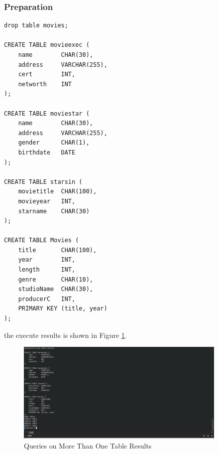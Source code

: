 \documentclass{cshwk}
\begin{document}
\subsubsection{Preparation}

\begin{lstlisting}
drop table movies;

CREATE TABLE movieexec (
    name        CHAR(30),
    address     VARCHAR(255),
    cert        INT,
    networth    INT
);

CREATE TABLE moviestar (
    name        CHAR(30),
    address     VARCHAR(255),
    gender      CHAR(1),
    birthdate   DATE
);

CREATE TABLE starsin (
    movietitle  CHAR(100),
    movieyear   INT,
    starname    CHAR(30)
);

CREATE TABLE Movies (
    title       CHAR(100),
    year        INT,
    length      INT,
    genre       CHAR(10),
    studioName  CHAR(30),
    producerC   INT,
    PRIMARY KEY (title, year)
);
\end{lstlisting}

the execute results is shown in Figure \ref{fig:more-than-one-table}.
\begin{figure}[htbp]
    \centering
    \includegraphics[width=0.9\textwidth]{hw4-9.png}
    \caption{Queries on More Than One Table Results}
    \label{fig:more-than-one-table}
\end{figure}
\end{document}
